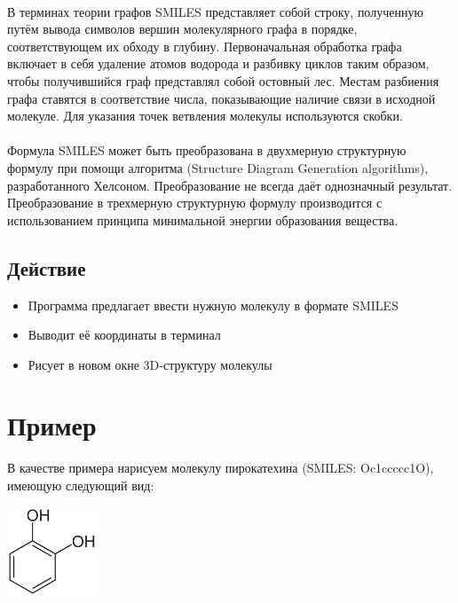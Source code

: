 \documentclass[a4paper,12pt]{article}
\begin{document}
\paragraph{} В терминах теории графов SMILES представляет собой строку, полученную путём вывода символов вершин молекулярного графа в порядке, соответствующем их обходу в глубину. Первоначальная обработка графа включает в себя удаление атомов водорода и разбивку циклов таким образом, чтобы получившийся граф представлял собой остовный лес. Местам разбиения графа ставятся в соответствие числа, показывающие наличие связи в исходной молекуле. Для указания точек ветвления молекулы используются скобки.
\paragraph{} Формула SMILES может быть преобразована в двухмерную структурную формулу при помощи алгоритма (Structure Diagram Generation algorithms), разработанного Хелсоном. Преобразование не всегда даёт однозначный результат. Преобразование в трехмерную структурную формулу производится с использованием принципа минимальной энергии образования вещества.

\subsection{Действие}
\begin{itemize}
\item Программа предлагает ввести нужную молекулу в формате SMILES
\item Выводит её координаты в терминал 
\item Рисует в новом окне 3D-структуру молекулы
\end{itemize}

\section{Пример}
В качестве примера нарисуем молекулу пирокатехина (SMILES: Oc1ccccc1O), имеющую следующий вид:

\begin{center}
    \includegraphics[width=0.2\textwidth]{Pirocatechin.png}\par\vspace{1 cm}
\end{center} 
\end{document}
